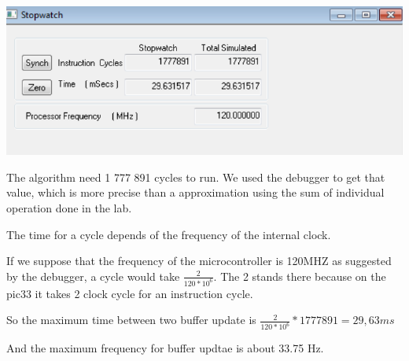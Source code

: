 \documentclass[a4paper]{article}
\begin{document}
\begin{center}
\includegraphics[scale=0.5]{files/stopwatch.png} 
\end{center}

The algorithm need 1 777 891 cycles to run. We used the debugger to get that value, which is more precise than a approximation using the sum of individual operation done in the lab.

The time for a cycle depends of the frequency of the internal clock.

If we suppose that the frequency of the microcontroller is 120MHZ as suggested by the debugger, a cycle would take $ \frac{2}{120 * 10^{6} }$. The 2 stands there because on the pic33 it takes 2 clock cycle for an instruction cycle.

So the maximum time between two buffer update is $ \frac{2}{120 * 10^{6} } * 1 777 891 =  29,63 ms $

And the maximum frequency for buffer updtae is about 33.75 Hz. 
\end{document}
